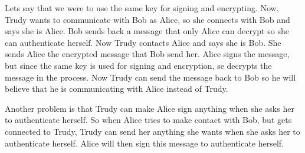 Lets say that we were to use the same key for signing and encrypting. Now, Trudy wants to communicate with Bob as Alice, so she connects with Bob and says she is Alice. Bob sends back a message that only Alice can decrypt so she can authenticate herself. Now Trudy contacts Alice and says she is Bob. She sends Alice the encrypted message that Bob send her. Alice signs the message, but since the same key is used for signing and encryption, se decrypts the message in the process. Now Trudy can send the message back to Bob so he will believe that he is communicating with Alice instead of Trudy. 

Another problem is that Trudy can make Alice sign anything when she asks her to authenticate herself. So when Alice tries to make contact with Bob, but gets connected to Trudy, Trudy can send her anything she wants when she asks her to authenticate herself. Alice will then sign this message to authenticate herself. 